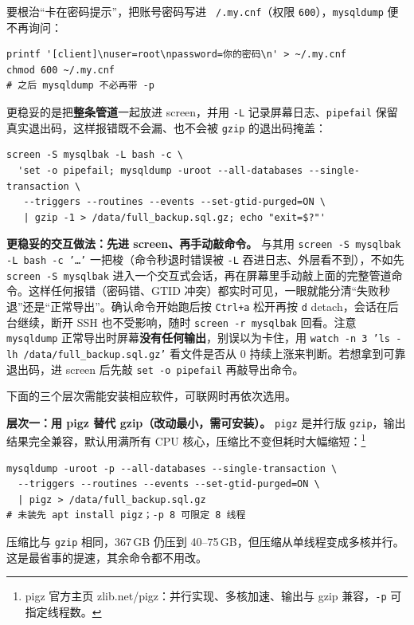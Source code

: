 \documentclass[12pt,UTF8]{ctexbook}
\begin{document}
要根治“卡在密码提示”，把账号密码写进 \texttt{~/.my.cnf}（权限 \texttt{600}），\texttt{mysqldump} 便不再询问：

\begin{lstlisting}
printf '[client]\nuser=root\npassword=你的密码\n' > ~/.my.cnf
chmod 600 ~/.my.cnf
# 之后 mysqldump 不必再带 -p
\end{lstlisting}

更稳妥的是把\textbf{整条管道}一起放进 screen，并用 \texttt{-L} 记录屏幕日志、\texttt{pipefail} 保留真实退出码，这样报错既不会漏、也不会被 \texttt{gzip} 的退出码掩盖：

\begin{lstlisting}
screen -S mysqlbak -L bash -c \
  'set -o pipefail; mysqldump -uroot --all-databases --single-transaction \
   --triggers --routines --events --set-gtid-purged=ON \
   | gzip -1 > /data/full_backup.sql.gz; echo "exit=$?"'
\end{lstlisting}

\textbf{更稳妥的交互做法：先进 screen、再手动敲命令。} 与其用 \texttt{screen -S mysqlbak -L bash -c '\ldots'} 一把梭（命令秒退时错误被 \texttt{-L} 吞进日志、外层看不到），不如先 \texttt{screen -S mysqlbak} 进入一个交互式会话，再在屏幕里手动敲上面的完整管道命令。这样任何报错（密码错、GTID 冲突）都实时可见，一眼就能分清“失败秒退”还是“正常导出”。确认命令开始跑后按 \texttt{Ctrl+a} 松开再按 \texttt{d} detach，会话在后台继续，断开 SSH 也不受影响，随时 \texttt{screen -r mysqlbak} 回看。注意 \texttt{mysqldump} 正常导出时屏幕\textbf{没有任何输出}，别误以为卡住，用 \texttt{watch -n 3 'ls -lh /data/full\_backup.sql.gz'} 看文件是否从 0 持续上涨来判断。若想拿到可靠退出码，进 screen 后先敲 \texttt{set -o pipefail} 再敲导出命令。

下面的三个层次需能安装相应软件，可联网时再依次选用。

\textbf{层次一：用 pigz 替代 gzip（改动最小，需可安装）。} \texttt{pigz} 是并行版 \texttt{gzip}，输出结果完全兼容，默认用满所有 CPU 核心，压缩比不变但耗时大幅缩短：\footnote{pigz 官方主页 zlib.net/pigz：并行实现、多核加速、输出与 gzip 兼容，\texttt{-p} 可指定线程数。}

\begin{lstlisting}
mysqldump -uroot -p --all-databases --single-transaction \
  --triggers --routines --events --set-gtid-purged=ON \
  | pigz > /data/full_backup.sql.gz
# 未装先 apt install pigz；-p 8 可限定 8 线程
\end{lstlisting}

压缩比与 \texttt{gzip} 相同，367\,GB 仍压到 40--75\,GB，但压缩从单线程变成多核并行。这是最省事的提速，其余命令都不用改。
\end{document}
